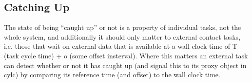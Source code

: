 \documentclass[11pt,a4paper]{article}
\begin{document}
\subsection{Catching Up}

The state of being ``caught up'' or not is a property of individual
tasks, not the whole system, and additionally it should only matter to
external contact tasks, i.e. those that wait on external data that is
available at a wall clock time of T (task cycle time) + o (some offset
insterval). Where this matters an external task can detect whether or
not it has caught up (and signal this to its proxy object in cylc) by
comparing its reference time (and offset) to the wall clock time.
\end{document}
